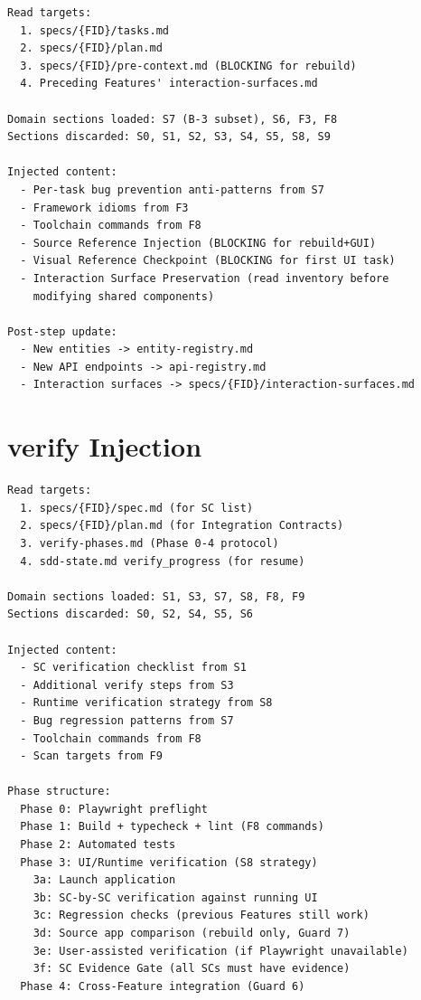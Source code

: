 \documentclass[11pt,a4paper,openright,twoside]{report}
\begin{document}
\begin{lstlisting}[title={implement Context Assembly}]
Read targets:
  1. specs/{FID}/tasks.md
  2. specs/{FID}/plan.md
  3. specs/{FID}/pre-context.md (BLOCKING for rebuild)
  4. Preceding Features' interaction-surfaces.md

Domain sections loaded: S7 (B-3 subset), S6, F3, F8
Sections discarded: S0, S1, S2, S3, S4, S5, S8, S9

Injected content:
  - Per-task bug prevention anti-patterns from S7
  - Framework idioms from F3
  - Toolchain commands from F8
  - Source Reference Injection (BLOCKING for rebuild+GUI)
  - Visual Reference Checkpoint (BLOCKING for first UI task)
  - Interaction Surface Preservation (read inventory before
    modifying shared components)

Post-step update:
  - New entities -> entity-registry.md
  - New API endpoints -> api-registry.md
  - Interaction surfaces -> specs/{FID}/interaction-surfaces.md
\end{lstlisting}

\section{verify Injection}

\begin{lstlisting}[title={verify Context Assembly}]
Read targets:
  1. specs/{FID}/spec.md (for SC list)
  2. specs/{FID}/plan.md (for Integration Contracts)
  3. verify-phases.md (Phase 0-4 protocol)
  4. sdd-state.md verify_progress (for resume)

Domain sections loaded: S1, S3, S7, S8, F8, F9
Sections discarded: S0, S2, S4, S5, S6

Injected content:
  - SC verification checklist from S1
  - Additional verify steps from S3
  - Runtime verification strategy from S8
  - Bug regression patterns from S7
  - Toolchain commands from F8
  - Scan targets from F9

Phase structure:
  Phase 0: Playwright preflight
  Phase 1: Build + typecheck + lint (F8 commands)
  Phase 2: Automated tests
  Phase 3: UI/Runtime verification (S8 strategy)
    3a: Launch application
    3b: SC-by-SC verification against running UI
    3c: Regression checks (previous Features still work)
    3d: Source app comparison (rebuild only, Guard 7)
    3e: User-assisted verification (if Playwright unavailable)
    3f: SC Evidence Gate (all SCs must have evidence)
  Phase 4: Cross-Feature integration (Guard 6)
\end{lstlisting}
\end{document}
